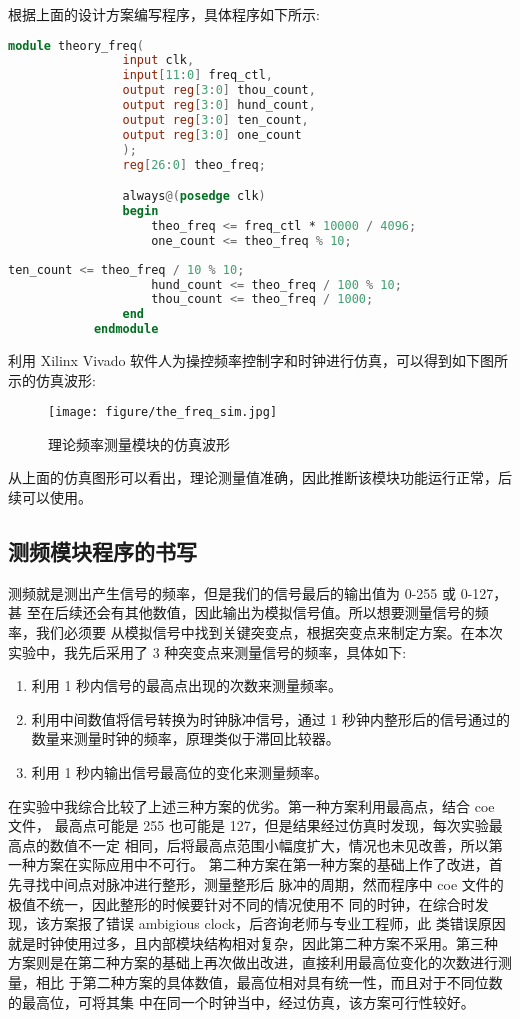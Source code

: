 {\begin{spacing}{1.5}
			根据上面的设计方案编写程序，具体程序如下所示:
			\begin{lstlisting}[language=Verilog]
			module theory_freq(
				input clk,
				input[11:0] freq_ctl,
				output reg[3:0] thou_count,
				output reg[3:0] hund_count,
				output reg[3:0] ten_count,
				output reg[3:0] one_count
				);
				reg[26:0] theo_freq;

				always@(posedge clk)
				begin
					theo_freq <= freq_ctl * 10000 / 4096;
					one_count <= theo_freq % 10;
			\end{lstlisting}
			\begin{lstlisting}[language=Verilog]
					ten_count <= theo_freq / 10 % 10;
					hund_count <= theo_freq / 100 % 10;
					thou_count <= theo_freq / 1000;
				end
			endmodule
			\end{lstlisting}

			利用 Xilinx Vivado 软件人为操控频率控制字和时钟进行仿真，可以得到如下图所示的仿真波形:
			\newline
			\begin{figure}[htbp]
				\centering
				\texttt{[image: figure/the\_freq\_sim.jpg]}
				\caption{理论频率测量模块的仿真波形}\label{fig:the_freq_sim}
			\end{figure}

			从上面的仿真图形可以看出，理论测量值准确，因此推断该模块功能运行正常，后续可以使用。
		\subsection{测频模块程序的书写}
			测频就是测出产生信号的频率，但是我们的信号最后的输出值为 0-255 或 0-127，甚 至在后续还会有其他数值，因此输出为模拟信号值。所以想要测量信号的频率，我们必须要 从模拟信号中找到关键突变点，根据突变点来制定方案。在本次实验中，我先后采用了 3 种突变点来测量信号的频率，具体如下:
			\begin{enumerate}
				\item 利用 1 秒内信号的最高点出现的次数来测量频率。
				\item 利用中间数值将信号转换为时钟脉冲信号，通过 1 秒钟内整形后的信号通过的 数量来测量时钟的频率，原理类似于滞回比较器。
				\item 利用 1 秒内输出信号最高位的变化来测量频率。
			\end{enumerate}
			在实验中我综合比较了上述三种方案的优劣。第一种方案利用最高点，结合 coe 文件， 最高点可能是 255 也可能是 127，但是结果经过仿真时发现，每次实验最高点的数值不一定 相同，后将最高点范围小幅度扩大，情况也未见改善，所以第一种方案在实际应用中不可行。 第二种方案在第一种方案的基础上作了改进，首先寻找中间点对脉冲进行整形，测量整形后 脉冲的周期，然而程序中 coe 文件的极值不统一，因此整形的时候要针对不同的情况使用不 同的时钟，在综合时发现，该方案报了错误 ambigious clock，后咨询老师与专业工程师，此 类错误原因就是时钟使用过多，且内部模块结构相对复杂，因此第二种方案不采用。第三种 方案则是在第二种方案的基础上再次做出改进，直接利用最高位变化的次数进行测量，相比 于第二种方案的具体数值，最高位相对具有统一性，而且对于不同位数的最高位，可将其集 中在同一个时钟当中，经过仿真，该方案可行性较好。


\end{spacing}}

